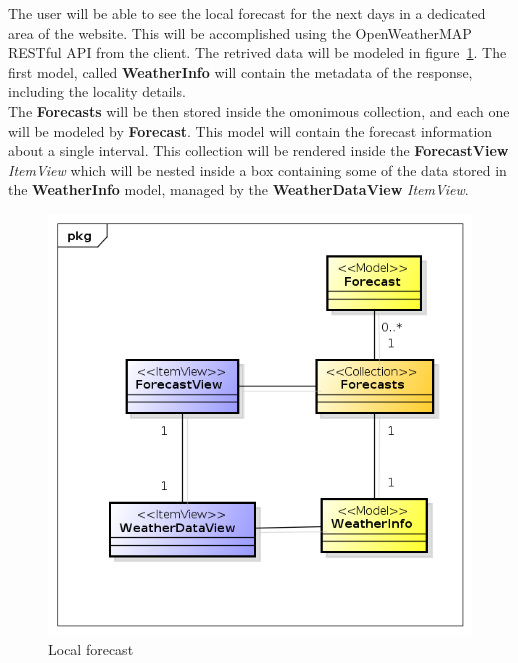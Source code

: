 The user will be able to see the local forecast for the next days in a dedicated area of the website. This will be accomplished using the OpenWeatherMAP RESTful API from the client. The retrived data will be modeled in figure~\ref{fig:forecastMVC}.
The first model, called \textbf{WeatherInfo} will contain the metadata of the response, including the locality details.\\
The \textbf{Forecasts} will be then stored inside the omonimous collection, and each one will be modeled by \textbf{Forecast}. This model will contain the forecast information about a single interval. This collection will be rendered inside the \textbf{ForecastView} \textit{ItemView} which will be nested inside a box containing some of the data stored in the \textbf{WeatherInfo} model, managed by the \textbf{WeatherDataView} \textit{ItemView}.
\begin{center}
 \begin{figure}[H]
    \includegraphics[width=1\textwidth]{../MVCDiagram/MVCBackbone/Forecast.png}
    \caption{Local forecast}
     \label{fig:forecastMVC}
     \end{figure}
   \end{center}
   
